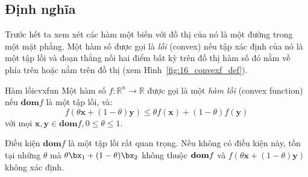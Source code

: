  
 
\subsection{Định nghĩa}
Trước hết ta xem xét các hàm một biến với đồ thị của nó là một đường trong một
mặt phẳng. Một hàm số được gọi là \textit{lồi} (convex) nếu {tập xác định của nó
là một tập lồi} và đoạn thẳng nối hai điểm bất kỳ trên đồ thị hàm số đó nằm về phía trên hoặc nằm trên đồ thị (xem
Hình~\ref{fig:16_convexf_def}). 
\begin{mydef}{Hàm lồi}{cvxfun}
    Một hàm số $f: \mathbb{R}^n \rightarrow \mathbb{R} $ được gọi là một \textit{hàm lồi} (convex function) nếu $\textbf{dom} f$ là một {tập lồi}, và: 
\begin{equation*} 
f(\theta\mathbf{x} + (1 - \theta) \mathbf{y}) \leq \theta f(\mathbf{x}) + (1 - \theta)f(\mathbf{y}) 
\end{equation*} 
với mọi $\mathbf{x, y} \in \textbf{dom}f, 0 \leq \theta \leq 1$. 
\end{mydef}


Điều kiện $\textbf{dom} f$ là một {tập lồi} rất quan trọng. Nếu không
có điều kiện này, tồn tại những $\theta$ mà $\theta \bx_1 + (1-\theta)\bx_2$
không thuộc $\boldsymbol{\mathbf{dom}} f$ và $f(\theta\mathbf{x} + (1 -
\theta)
\mathbf{y}) $ không xác định.
 

